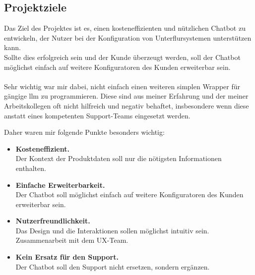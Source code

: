 \subsection{Projektziele}\label{sec:proj_ziele}
Das Ziel des Projektes ist es, einen kosteneffizienten und nützlichen Chatbot zu entwickeln, der Nutzer  
bei der Konfiguration von Unterflursystemen unterstützen kann.\\  
Sollte dies erfolgreich sein und der Kunde überzeugt werden, soll der Chatbot  
möglichst einfach auf weitere Konfiguratoren des Kunden erweiterbar sein.\\\\  
Sehr wichtig war mir dabei, nicht einfach einen weiteren simplen Wrapper für gängige \gls{llm} zu programmieren.  
Diese sind aus meiner Erfahrung und der meiner Arbeitskollegen oft nicht hilfreich und negativ behaftet, insbesondere wenn diese  
anstatt eines kompetenten Support-Teams eingesetzt werden.

Daher waren mir folgende Punkte besonders wichtig:
\begin{itemize}
    \item \textbf{Kosteneffizient.}\\Der Kontext der Produktdaten soll nur die nötigsten Informationen enthalten.
    \item \textbf{Einfache Erweiterbarkeit.}\\Der Chatbot soll möglichst einfach auf weitere Konfiguratoren des Kunden erweiterbar sein.
    \item \textbf{Nutzerfreundlichkeit.}\\Das Design und die Interaktionen sollen möglichst intuitiv sein. Zusammenarbeit mit dem UX-Team.
    \item \textbf{Kein Ersatz für den Support.}\\Der Chatbot soll den Support nicht ersetzen, sondern ergänzen.
\end{itemize}